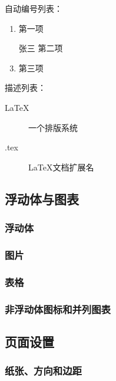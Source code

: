 \documentclass{ctexart}
\begin{document}
            自动编号列表：
            \begin{enumerate}
                \item 第一项
                \item [张三] 第二项 %
                \item 第三项
            \end{enumerate}

            描述列表：
            \begin{description}
                \item[LaTeX] 一个排版系统
                \item[.tex] LaTeX文档扩展名  
            \end{description}

    \subsection{浮动体与图表}

        \subsubsection{浮动体}

        \subsubsection{图片}

        \subsubsection{表格}

        \subsubsection{非浮动体图标和并列图表}

    \subsection{页面设置}
        \subsubsection{纸张、方向和边距}
\end{document}

